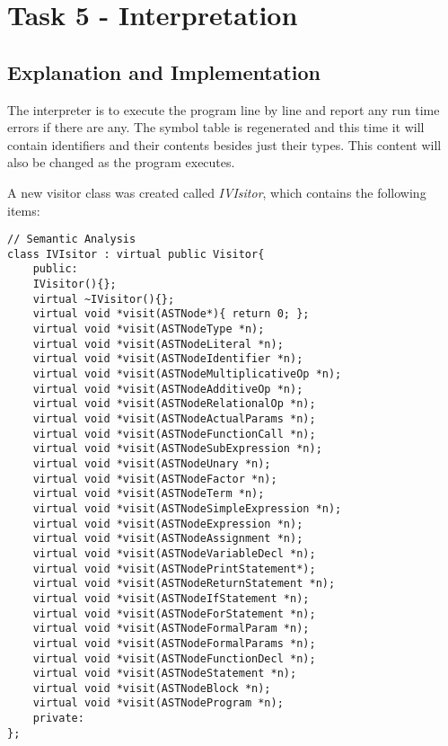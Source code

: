 \section{Task 5 - Interpretation}
\subsection{Explanation and Implementation}
The interpreter is to execute the program line by line and report any run time errors if there are any. The symbol table is regenerated and this time it will contain identifiers and their contents besides just their types. This content will also be changed as the program executes.

A new visitor class was created called \textit{IVIsitor}, which contains the following items:

\begin{lstlisting}
// Semantic Analysis
class IVIsitor : virtual public Visitor{
	public:
	IVisitor(){};
	virtual ~IVisitor(){};
	virtual void *visit(ASTNode*){ return 0; };
	virtual void *visit(ASTNodeType *n);
	virtual void *visit(ASTNodeLiteral *n);
	virtual void *visit(ASTNodeIdentifier *n);
	virtual void *visit(ASTNodeMultiplicativeOp *n);
	virtual void *visit(ASTNodeAdditiveOp *n);
	virtual void *visit(ASTNodeRelationalOp *n);
	virtual void *visit(ASTNodeActualParams *n);
	virtual void *visit(ASTNodeFunctionCall *n);
	virtual void *visit(ASTNodeSubExpression *n);
	virtual void *visit(ASTNodeUnary *n);
	virtual void *visit(ASTNodeFactor *n);
	virtual void *visit(ASTNodeTerm *n);
	virtual void *visit(ASTNodeSimpleExpression *n);
	virtual void *visit(ASTNodeExpression *n);
	virtual void *visit(ASTNodeAssignment *n);
	virtual void *visit(ASTNodeVariableDecl *n);
	virtual void *visit(ASTNodePrintStatement*);
	virtual void *visit(ASTNodeReturnStatement *n);
	virtual void *visit(ASTNodeIfStatement *n);
	virtual void *visit(ASTNodeForStatement *n);
	virtual void *visit(ASTNodeFormalParam *n);
	virtual void *visit(ASTNodeFormalParams *n);
	virtual void *visit(ASTNodeFunctionDecl *n);
	virtual void *visit(ASTNodeStatement *n);
	virtual void *visit(ASTNodeBlock *n);
	virtual void *visit(ASTNodeProgram *n);
	private:
};
\end{lstlisting}

